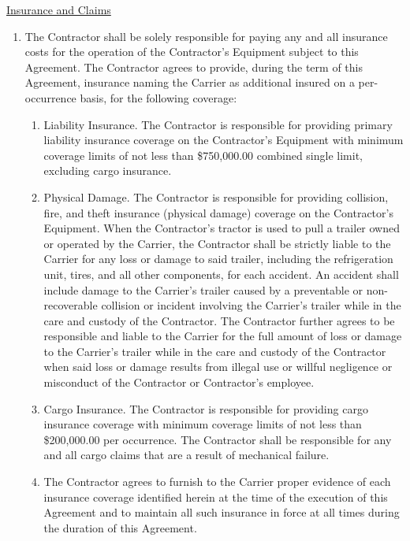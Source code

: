 \underline{Insurance and Claims}
\begin{enumerate}
    \item The Contractor shall be solely responsible for paying any and all
    insurance costs for the operation of the Contractor's Equipment subject
    to this Agreement. The Contractor agrees to provide, during the term of
    this Agreement, insurance naming the Carrier as additional insured on a
    per-occurrence basis, for the following coverage:
    \begin{enumerate}
        \item Liability Insurance. The Contractor is responsible for
        providing primary liability insurance coverage on the Contractor's
        Equipment with minimum coverage limits of not less than
        \$750,000.00 combined single limit, excluding cargo insurance.

        \item Physical Damage. The Contractor is responsible for providing
        collision, fire, and theft insurance (physical damage) coverage on
        the Contractor's Equipment. When the Contractor's tractor is used
        to pull a trailer owned or operated by the Carrier, the Contractor
        shall be strictly liable to the Carrier for any loss or damage to
        said trailer, including the refrigeration unit, tires, and all
        other components, for each accident. An accident shall include
        damage to the Carrier's trailer caused by a preventable or non-
        recoverable collision or incident involving the Carrier's trailer
        while in the care and custody of the Contractor. The Contractor
        further agrees to be responsible and liable to the Carrier for the
        full amount of loss or damage to the Carrier's trailer while in the
        care and custody of the Contractor when said loss or damage results
        from illegal use or willful negligence or misconduct of the
        Contractor or Contractor's employee.

        \item Cargo Insurance. The Contractor is responsible for providing
        cargo insurance coverage with minimum coverage limits of not less
        than \$200,000.00 per occurrence. The Contractor shall be
        responsible for any and all cargo claims that are a result of
        mechanical failure.

        \item The Contractor agrees to furnish to the Carrier proper
        evidence of each insurance coverage identified herein at the time
        of the execution of this Agreement and to maintain all such
        insurance in force at all times during the duration of this
        Agreement.


\end{enumerate}
\end{enumerate}
